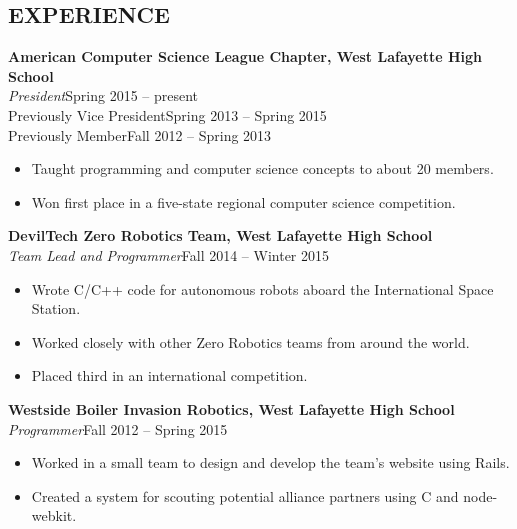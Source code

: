 \documentclass[line,margin]{res}
\begin{document}
\begin{resume}
  \section{EXPERIENCE}
  {\bf\rmfamily American Computer Science League Chapter, West Lafayette High School}\\
  \emph{President}\hfill Spring 2015 -- present\\
  Previously Vice President\hfill Spring 2013 -- Spring 2015\\
  Previously Member\hfill Fall 2012 -- Spring 2013
  \begin{itemize}  \itemsep -2pt %
  \item Taught programming and computer science concepts to about 20 members.
  \item Won first place in a five-state regional computer science competition.
  \end{itemize}

  {\bf\rmfamily DevilTech Zero Robotics Team, West Lafayette High School}\\
  \emph{Team Lead and Programmer}\hfill Fall 2014 -- Winter 2015
  \begin{itemize}  \itemsep -2pt %
  \item Wrote C/C++ code for autonomous robots aboard the International Space Station.
  \item Worked closely with other Zero Robotics teams from around the world.
  \item Placed third in an international competition.
  \end{itemize}

  {\bf\rmfamily  Westside Boiler Invasion Robotics, West Lafayette High School}\\
  \emph{Programmer}\hfill Fall 2012 -- Spring 2015
  \begin{itemize}  \itemsep -2pt %
  \item Worked in a small team to design and develop the team's website using Rails.
  \item Created a system for scouting potential alliance partners using C and node-webkit.
  \end{itemize}




\end{resume}
\end{document}
